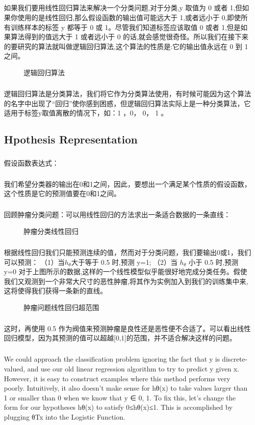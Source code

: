 \documentclass{article}
\begin{document}
\begin{CJK}{UTF8}{gbsn}
\subparagraph{}
如果我们要用线性回归算法来解决一个分类问题,对于分类,y 取值为 0 或者 1,但如果你使用的是线性回归,那么假设函数的输出值可能远大于 1,或者远小于 0,即使所有训练样本的标签 y 都等于 0 或 1。尽管我们知道标签应该取值 0 或者 1,但是如果算法得到的值远大于 1 或者远小于 0 的话,就会感觉很奇怪。所以我们在接下来的要研究的算法就叫做逻辑回归算法,这个算法的性质是:它的输出值永远在 0 到 1 之间。
\begin{figure}[H]
\caption{逻辑回归算法}
\label{fig:303}
\end{figure}
\subparagraph{}
逻辑回归算法是分类算法，我们将它作为分类算法使用，有时候可能因为这个算法的名字中出现了“回归”使你感到困惑，但逻辑回归算法实际上是一种分类算法，它适用于标签y取值离散的情况下，如：1 ，0， 0， 1 。
\subsection{Hpothesis Representation}
\subparagraph{}
假设函数表达式：
\subparagraph{}
我们希望分类器的输出在0和1之间，因此，要想出一个满足某个性质的假设函数，这个性质是它的预测值要在0和1之间。
\subparagraph{}
回顾肿瘤分类问题：可以用线性回归的方法求出一条适合数据的一条直线：
\begin{figure}[H]
\caption{肿瘤分类线性回归}
\label{fig:304}
\end{figure}
\subparagraph{}
根据线性回归我们只能预测连续的值，然而对于分类问题，我们要输出0或1，我们可以预测：
（1）当$h_\theta$大于等于 0.5 时,预测 y=1;
（2）当 $h_\theta$ 小于 0.5 时,预测 y=0 对于上图所示的数据,这样的一个线性模型似乎能很好地完成分类任务。假使我们又观测到一个非常大尺寸的恶性肿瘤,将其作为实例加入到我们的训练集中来,这将使得我们获得一条新的直线。
\begin{figure}[H]
\caption{肿瘤问题线性回归超范围}
\label{fig:305}
\end{figure}
\subparagraph{}
这时，再使用 0.5 作为阀值来预测肿瘤是良性还是恶性便不合适了。可以看出线性回归模型，因为其预测的值可以超越[0,1]的范围，并不适合解决这样的问题。
\subparagraph{}
We could approach the classification problem ignoring the fact that y is discrete-valued, and use our old linear regression algorithm to try to predict y given x. However, it is easy to construct examples where this method performs very poorly. Intuitively, it also doesn’t make sense for hθ(x) to take values larger than 1 or smaller than 0 when we know that y ∈ {0, 1}. To fix this, let’s change the form for our hypotheses hθ(x) to satisfy 0≤hθ(x)≤1. This is accomplished by plugging θTx into the Logistic Function.

\end{CJK}
\end{document}
